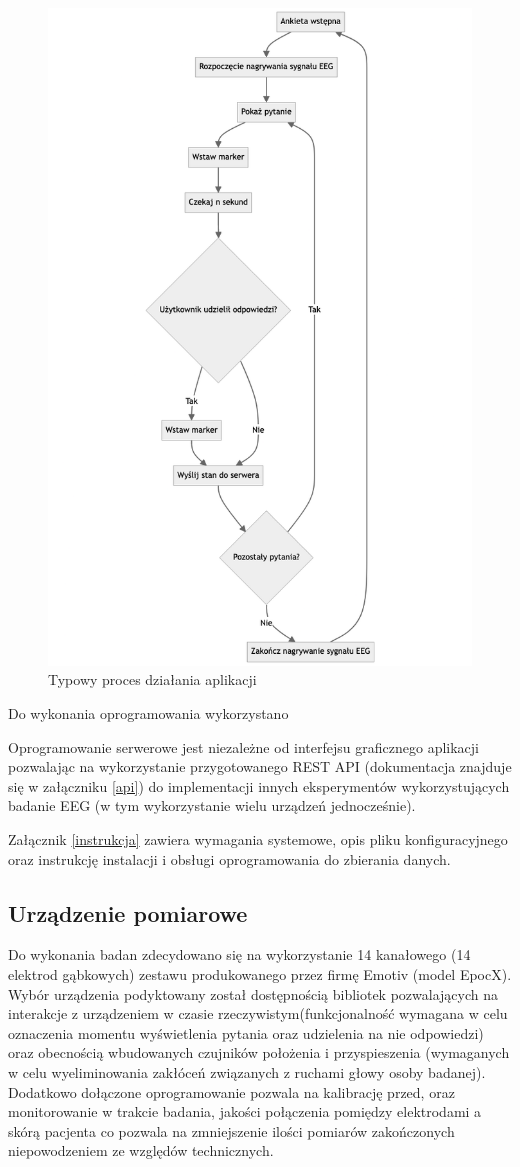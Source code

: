 \documentclass{./assets/wfis}
\begin{document}
\begin{figure}[h!]
    \centering
    \includegraphics[width=0.5\columnwidth]{thesis/assets/app_flow_diagram.png}
    \caption{Typowy proces działania aplikacji}
    \label{fig:app-flow}
\end{figure}

Do wykonania oprogramowania wykorzystano

Oprogramowanie serwerowe jest niezależne od interfejsu graficznego aplikacji pozwalając na wykorzystanie przygotowanego REST API (dokumentacja znajduje się w załączniku \ref{api}) do implementacji innych eksperymentów wykorzystujących badanie EEG (w tym wykorzystanie wielu urządzeń jednocześnie).

Załącznik \ref{instrukcja} zawiera wymagania systemowe, opis pliku konfiguracyjnego oraz instrukcję instalacji i obsługi oprogramowania do zbierania danych.

\subsection{Urządzenie pomiarowe}\label{emotiv}
Do wykonania badan zdecydowano się na wykorzystanie 14 kanałowego (14 elektrod gąbkowych)  zestawu produkowanego przez firmę Emotiv (model EpocX\cite{emotiv_inc_epoc_nodate}). Wybór urządzenia podyktowany został dostępnością bibliotek pozwalających na interakcje z urządzeniem w czasie rzeczywistym\cite{emotiv_inc_emotiv_nodate-1}(funkcjonalność wymagana w celu oznaczenia momentu wyświetlenia pytania oraz udzielenia na nie odpowiedzi) oraz obecnością wbudowanych czujników położenia i przyspieszenia (wymaganych w celu wyeliminowania zakłóceń związanych z ruchami głowy osoby badanej). Dodatkowo dołączone oprogramowanie pozwala na kalibrację przed, oraz monitorowanie w trakcie badania, jakości połączenia pomiędzy elektrodami a skórą pacjenta co pozwala na zmniejszenie ilości pomiarów zakończonych niepowodzeniem ze względów technicznych.
\end{document}
